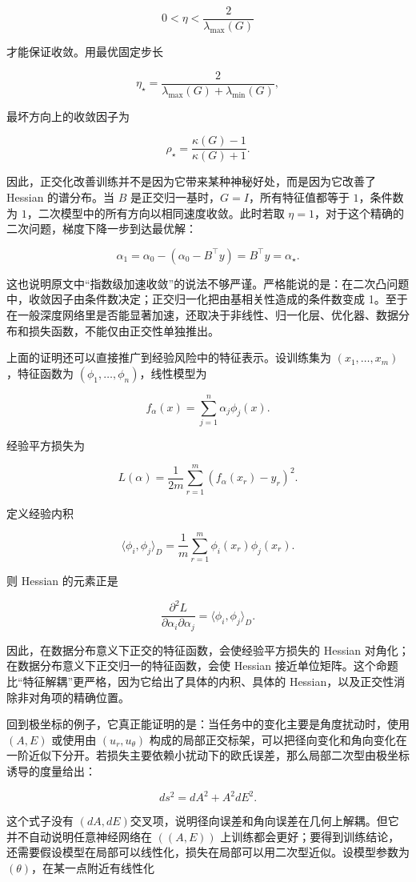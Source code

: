 \[
0<\eta<\frac{2}{\lambda_{\max}(G)}
\]

才能保证收敛。用最优固定步长

\[
\eta_\star=\frac{2}{\lambda_{\max}(G)+\lambda_{\min}(G)},
\]

最坏方向上的收敛因子为

\[
\rho_\star=\frac{\kappa(G)-1}{\kappa(G)+1}.
\]

因此，正交化改善训练并不是因为它带来某种神秘好处，而是因为它改善了 Hessian 的谱分布。当 \(B\) 是正交归一基时，\(G=I\)，所有特征值都等于 \(1\)，条件数为 \(1\)，二次模型中的所有方向以相同速度收敛。此时若取 \(\eta=1\)，对于这个精确的二次问题，梯度下降一步到达最优解：

\[
\alpha_{1}=\alpha_0-(\alpha_0-B^\top y)=B^\top y=\alpha_\star.
\]

这也说明原文中“指数级加速收敛”的说法不够严谨。严格能说的是：在二次凸问题中，收敛因子由条件数决定；正交归一化把由基相关性造成的条件数变成 1。至于在一般深度网络里是否能显著加速，还取决于非线性、归一化层、优化器、数据分布和损失函数，不能仅由正交性单独推出。

上面的证明还可以直接推广到经验风险中的特征表示。设训练集为 \((x_1,\ldots,x_m)\)，特征函数为 \((\phi_1,\ldots,\phi_n)\)，线性模型为

\[
f_\alpha(x)=\sum_{j=1}^n \alpha_j\phi_j(x).
\]

经验平方损失为

\[
L(\alpha)=\frac{1}{2m}\sum_{r=1}^m\left(f_\alpha(x_r)-y_r\right)^2.
\]

定义经验内积

\[
\langle \phi_i,\phi_j\rangle_D
=\frac{1}{m}\sum_{r=1}^m \phi_i(x_r)\phi_j(x_r).
\]

则 Hessian 的元素正是

\[
\frac{\partial^2 L}{\partial \alpha_i\partial \alpha_j}
=\langle \phi_i,\phi_j\rangle_D.
\]

因此，在数据分布意义下正交的特征函数，会使经验平方损失的 Hessian 对角化；在数据分布意义下正交归一的特征函数，会使 Hessian 接近单位矩阵。这个命题比“特征解耦”更严格，因为它给出了具体的内积、具体的 Hessian，以及正交性消除非对角项的精确位置。

回到极坐标的例子，它真正能证明的是：当任务中的变化主要是角度扰动时，使用 \((A,E)\) 或使用由 \((u_r,u_\theta)\) 构成的局部正交标架，可以把径向变化和角向变化在一阶近似下分开。若损失主要依赖小扰动下的欧氏误差，那么局部二次型由极坐标诱导的度量给出：

\[
ds^2=dA^2+A^2dE^2.
\]

这个式子没有 \((dA,dE) \)交叉项，说明径向误差和角向误差在几何上解耦。但它并不自动说明任意神经网络在 \(((A,E))\) 上训练都会更好；要得到训练结论，还需要假设模型在局部可以线性化，损失在局部可以用二次型近似。设模型参数为 \((\theta)\)，在某一点附近有线性化

